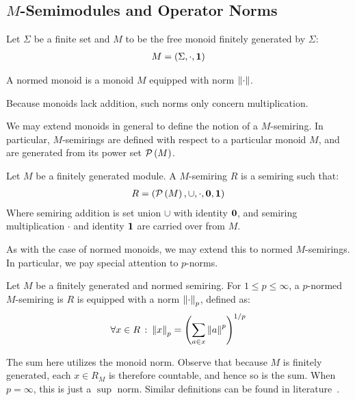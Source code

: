 
\subsection{\(M\)-Semimodules and Operator Norms}
Let \(\Sigma\) be a finite set and
\(M\) to be the free monoid finitely generated by \(\Sigma\):
\begin{align*}
  M = \left(\Sigma, \cdot, \mathbf{1}\right)
\end{align*}

\begin{definition}
  A normed monoid is a monoid \(M\) equipped with norm \(\left\lVert\cdot\right\rVert\).
\end{definition}

Because monoids lack addition,
such norms only concern multiplication.

We may extend monoids in general to define the notion of a \(M\)-semiring.
In particular,
\(M\)-semirings are defined with respect to a particular monoid \(M\),
and are generated from its power set \(\mathcal{P}\left(M\right)\).

\begin{definition}[\(M\)-Semiring]
  Let \(M\) be a finitely generated module.
  A \(M\)-semiring \(R\) is a semiring such that:
  \begin{align*}
    R = \left(\mathcal{P}\left(M\right), \cup, \cdot, \mathbf{0}, \mathbf{1}\right)
  \end{align*}
  Where semiring addition is set union \(\cup\) with identity \(\mathbf{0}\),
  and semiring multiplication \(\cdot\) and identity \(\mathbf{1}\)
  are carried over from \(M\).
\end{definition}

As with the case of normed monoids,
we may extend this to normed \(M\)-semirings.
In particular, we pay special attention to \(p\)-norms.

\begin{definition}
  Let \(M\) be a finitely generated and normed semiring.
  For \(1 \leq p \leq \infty\),
  a \(p\)-normed \(M\)-semiring is \(R\)
  is equipped with a norm \(\left\lVert\cdot\right\rVert_p\), defined as:
  \begin{align*}
    \forall x \in R \ \colon
      \left\lVert x\right\rVert_{p} = \left(\sum_{a \in x} \left\lVert a\right\rVert ^p\right)^{1/p}
  \end{align*}
\end{definition}

The sum here utilizes the monoid norm.
Observe that because \(M\) is finitely generated,
each \(x \in R_M\) is therefore countable,
and hence so is the sum.
When \(p = \infty\), this is just a \(\sup\) norm.
Similar definitions can be found in literature~\cite{kudlek2000lemmata}.


